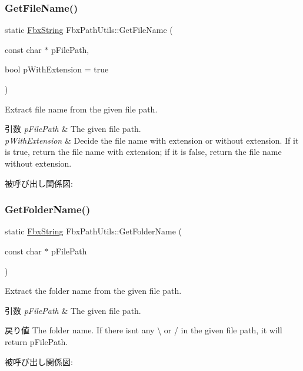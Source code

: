 \subsubsection{\texorpdfstring{Get\+File\+Name()}{GetFileName()}}
{\footnotesize\ttfamily static \hyperlink{class_fbx_string}{Fbx\+String} Fbx\+Path\+Utils\+::\+Get\+File\+Name (\begin{DoxyParamCaption}\item[{const char $\ast$}]{p\+File\+Path,  }\item[{bool}]{p\+With\+Extension = {\ttfamily true} }\end{DoxyParamCaption})\hspace{0.3cm}{\ttfamily [static]}}

Extract file name from the given file path. 
\begin{DoxyParams}{引数}
{\em p\+File\+Path} & The given file path. \\
\hline
{\em p\+With\+Extension} & Decide the file name with extension or without extension. If it is true, return the file name with extension; if it is false, return the file name without extension. \\
\hline
\end{DoxyParams}
被呼び出し関係図\+:
\mbox{\label{class_fbx_path_utils_a387c0512f521b504303361b2d79c4242}} 
\subsubsection{\texorpdfstring{Get\+Folder\+Name()}{GetFolderName()}}
{\footnotesize\ttfamily static \hyperlink{class_fbx_string}{Fbx\+String} Fbx\+Path\+Utils\+::\+Get\+Folder\+Name (\begin{DoxyParamCaption}\item[{const char $\ast$}]{p\+File\+Path }\end{DoxyParamCaption})\hspace{0.3cm}{\ttfamily [static]}}

Extract the folder name from the given file path. 
\begin{DoxyParams}{引数}
{\em p\+File\+Path} & The given file path. \\
\hline
\end{DoxyParams}
\begin{DoxyReturn}{戻り値}
The folder name. If there isn\textquotesingle{}t any \textquotesingle{}\textbackslash{}\textquotesingle{} or \textquotesingle{}/\textquotesingle{} in the given file path, it will return p\+File\+Path. 
\end{DoxyReturn}
被呼び出し関係図\+:
\mbox{\label{class_fbx_path_utils_a330b64c4fc722a47e0bb0a946249e021}} 
